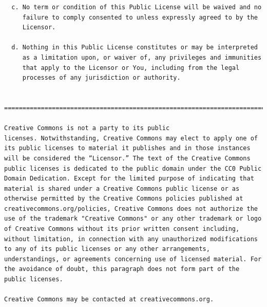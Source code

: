 \documentclass[12pt,spanish,]{article}
\begin{document}
\begin{verbatim}
  c. No term or condition of this Public License will be waived and no
     failure to comply consented to unless expressly agreed to by the
     Licensor.

  d. Nothing in this Public License constitutes or may be interpreted
     as a limitation upon, or waiver of, any privileges and immunities
     that apply to the Licensor or You, including from the legal
     processes of any jurisdiction or authority.


=======================================================================

Creative Commons is not a party to its public
licenses. Notwithstanding, Creative Commons may elect to apply one of
its public licenses to material it publishes and in those instances
will be considered the “Licensor.” The text of the Creative Commons
public licenses is dedicated to the public domain under the CC0 Public
Domain Dedication. Except for the limited purpose of indicating that
material is shared under a Creative Commons public license or as
otherwise permitted by the Creative Commons policies published at
creativecommons.org/policies, Creative Commons does not authorize the
use of the trademark "Creative Commons" or any other trademark or logo
of Creative Commons without its prior written consent including,
without limitation, in connection with any unauthorized modifications
to any of its public licenses or any other arrangements,
understandings, or agreements concerning use of licensed material. For
the avoidance of doubt, this paragraph does not form part of the
public licenses.

Creative Commons may be contacted at creativecommons.org.
\end{verbatim}
\end{document}
